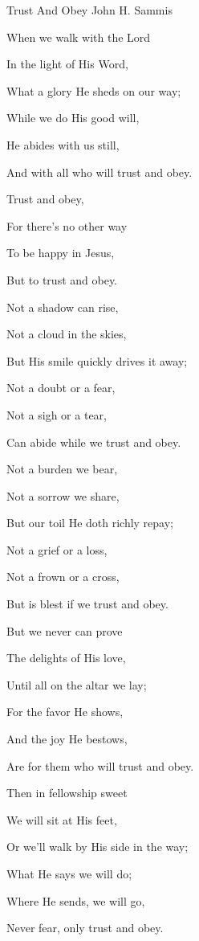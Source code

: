 \documentclass[12pt]{book}
\begin{document}
\begin{song}{Trust And Obey}{}
  {\SBPubDom}
  {John H. Sammis}
  {}
  {}

  \begin{SBVerse}
    When we walk with the Lord

    In the light of His Word,

    What a glory He sheds on our way;

    While we do His good will,

    He abides with us still,

    And with all who will trust and obey.
  \end{SBVerse}

  \begin{SBOpGroup}
    Trust and obey,

    For there's no other way

    To be happy in Jesus,

    But to trust and obey.
  \end{SBOpGroup}

  \begin{SBVerse}
    Not a shadow can rise,

    Not a cloud in the skies,

    But His smile quickly drives it away;

    Not a doubt or a fear,

    Not a sigh or a tear,

    Can abide while we trust and obey.
  \end{SBVerse}

  \begin{SBVerse}
    Not a burden we bear,

    Not a sorrow we share,

    But our toil He doth richly repay;

    Not a grief or a loss,

    Not a frown or a cross,

    But is blest if we trust and obey.
  \end{SBVerse}

  \begin{SBVerse}
    But we never can prove

    The delights of His love,

    Until all on the altar we lay;

    For the favor He shows,

    And the joy He bestows,

    Are for them who will trust and obey.
  \end{SBVerse}

  \begin{SBVerse}
    Then in fellowship sweet

    We will sit at His feet,

    Or we'll walk by His side in the way;

    What He says we will do;

    Where He sends, we will go,

    Never fear, only trust and obey.
  \end{SBVerse}
\end{song}
\end{document}

